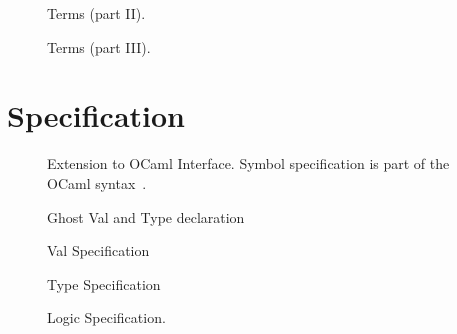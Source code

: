 \documentclass[a4paper,12pt]{book}
\begin{document}
\begin{figure}[p!]
\begin{center}\end{center}
\caption{Terms (part II).}
\label{fig:bnf:term2}
\end{figure}

\begin{figure}[p!]
\begin{center}\end{center}
\caption{Terms (part III).}
\label{fig:bnf:term3}
\end{figure}

\section{Specification}

\begin{figure}[p!]
\begin{center}\end{center}
\caption{Extension to OCaml Interface. Symbol
  specification is part of the OCaml
  syntax~\cite{OCamlRM}.}
\label{fig:bnf:spec}
\end{figure}

\begin{figure}[p!]
\begin{center}\end{center}
\caption{Ghost Val and Type declaration}
\label{fig:bnf:ghost-spec}
\end{figure}

\begin{figure}[p!]
\begin{center}\end{center}
\caption{Val Specification}
\label{fig:bnf:val-spec}
\end{figure}

\begin{figure}[p!]
\begin{center}\end{center}
\caption{Type Specification}
\label{fig:bnf:type-spec}
\end{figure}

\begin{figure}[p!]
\begin{center}\end{center}
\caption{Logic Specification.}
\label{fig:bnf:spec}
\end{figure}





\end{document}
